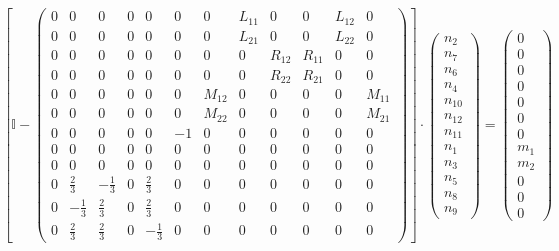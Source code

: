 \[ \left[ \mathbb{I}  - \left(\begin{smallmatrix} 0 & 0 & 0 & 0 & 0 & 0 & 0 & L_{11} & 0 & 0 & L_{12} & 0 \\ 0 & 0 & 0 & 0 & 0 & 0 & 0 & L_{21} & 0 & 0 & L_{22} & 0 \\ 0 & 0 & 0 & 0 & 0 & 0 & 0 & 0 & R_{12} & R_{11} & 0 & 0 \\ 0 & 0 & 0 & 0 & 0 & 0 & 0 & 0 & R_{22} & R_{21} & 0 & 0 \\ 0 & 0 & 0 & 0 & 0 & 0 & M_{12} & 0 & 0 & 0 & 0 & M_{11} \\ 0 & 0 & 0 & 0 & 0 & 0 & M_{22} & 0 & 0 & 0 & 0 & M_{21} \\ 0 & 0 & 0 & 0 & 0 & -1 & 0 & 0 & 0 & 0 & 0 & 0 \\ 0 & 0 & 0 & 0 & 0 & 0 & 0 & 0 & 0 & 0 & 0 & 0 \\ 0 & 0 & 0 & 0 & 0 & 0 & 0 & 0 & 0 & 0 & 0 & 0 \\ 0 & \frac{2}{3} & -\frac{1}{3} & 0 & \frac{2}{3} & 0 & 0 & 0 & 0 & 0 & 0 & 0 \\ 0 & -\frac{1}{3} & \frac{2}{3} & 0 & \frac{2}{3} & 0 & 0 & 0 & 0 & 0 & 0 & 0 \\ 0 & \frac{2}{3} & \frac{2}{3} & 0 & -\frac{1}{3} & 0 & 0 & 0 & 0 & 0 & 0 & 0 \end{smallmatrix}\right)\right] \cdot \left(\begin{smallmatrix} n_{2} \\ n_{7} \\ n_{6} \\ n_{4} \\ n_{10} \\ n_{12} \\ n_{11} \\ n_{1} \\ n_{3} \\ n_{5} \\ n_{8} \\ n_{9} \end{smallmatrix}\right) = \left(\begin{smallmatrix} 0 \\ 0 \\ 0 \\ 0 \\ 0 \\ 0 \\ 0 \\ m_{1} \\ m_{2} \\ 0 \\ 0 \\ 0 \end{smallmatrix}\right) \]
